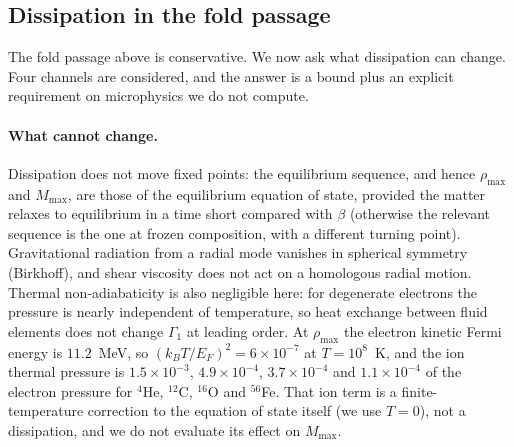 \documentclass[11pt]{article}
\begin{document}
\subsection{Dissipation in the fold passage}
\label{sec:fold-dissipation}

The fold passage above is conservative. We now ask what dissipation can change. Four channels are considered, and the answer is a bound plus an explicit requirement on microphysics we do not compute.

\paragraph{What cannot change.} Dissipation does not move fixed points: the equilibrium sequence, and hence $\rho_{\max}$ and $M_{\max}$, are those of the equilibrium equation of state, provided the matter relaxes to equilibrium in a time short compared with $\beta$ (otherwise the relevant sequence is the one at frozen composition, with a different turning point). Gravitational radiation from a radial mode vanishes in spherical symmetry (Birkhoff), and shear viscosity does not act on a homologous radial motion. Thermal non-adiabaticity is also negligible here: for degenerate electrons the pressure is nearly independent of temperature, so heat exchange between fluid elements does not change $\Gamma_1$ at leading order. At $\rho_{\max}$ the electron kinetic Fermi energy is $11.2$~MeV, so $(k_BT/E_F)^2=6\times10^{-7}$ at $T=10^8$~K, and the ion thermal pressure is $1.5\times10^{-3}$, $4.9\times10^{-4}$, $3.7\times10^{-4}$ and $1.1\times10^{-4}$ of the electron pressure for $^4$He, $^{12}$C, $^{16}$O and $^{56}$Fe. That ion term is a finite-temperature correction to the equation of state itself (we use $T=0$), not a dissipation, and we do not evaluate its effect on $M_{\max}$.
\end{document}
